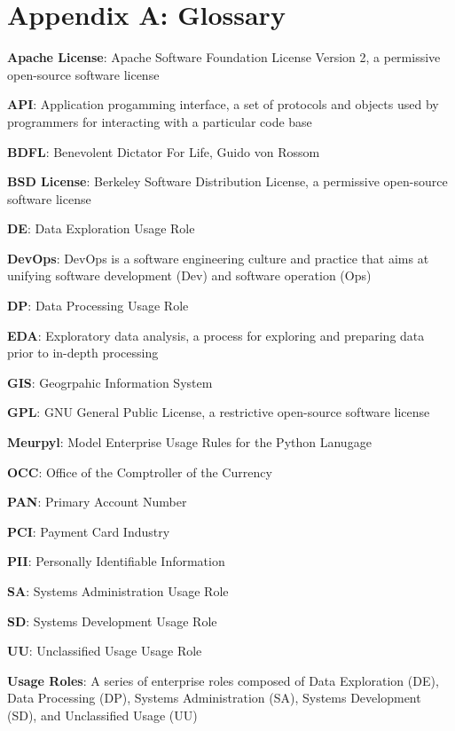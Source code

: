 \newcommand{\definition}[2]{
	\textbf{#1}: #2
}

\section{Appendix A: Glossary}

\thispagestyle{section_start_style}

    \definition{Apache License}{Apache Software Foundation License Version 2, a permissive open-source software license}

    \definition{API}{Application progamming interface, a set of protocols and objects used by programmers for interacting with a particular code base}

    \definition{BDFL}{Benevolent Dictator For Life, Guido von Rossom}

    \definition{BSD License}{Berkeley Software Distribution License, a permissive open-source software license}

	\definition{DE}{Data Exploration Usage Role}

    \definition{DevOps}{DevOps is a software engineering culture and practice that aims at unifying software development (Dev) and software operation (Ops)}

	\definition{DP}{Data Processing Usage Role}

	\definition{EDA}{Exploratory data analysis, a process for exploring and preparing data prior to in-depth processing}

	\definition{GIS}{Geogrpahic Information System}

    \definition{GPL}{GNU General Public License, a restrictive open-source software license}

	\definition{Meurpyl}{Model Enterprise Usage Rules for the Python Lanugage}

	\definition{OCC}{Office of the Comptroller of the Currency}

	\definition{PAN}{Primary Account Number}

	\definition{PCI}{Payment Card Industry}

	\definition{PII}{Personally Identifiable Information}

	\definition{SA}{Systems Administration Usage Role}

	\definition{SD}{Systems Development Usage Role}

	\definition{UU}{Unclassified Usage Usage Role}

	\definition{Usage Roles}{A series of enterprise roles composed of Data Exploration (DE), Data Processing (DP), Systems Administration (SA), Systems Development (SD), and Unclassified Usage (UU)}

\setlength{\parskip}{1em}
